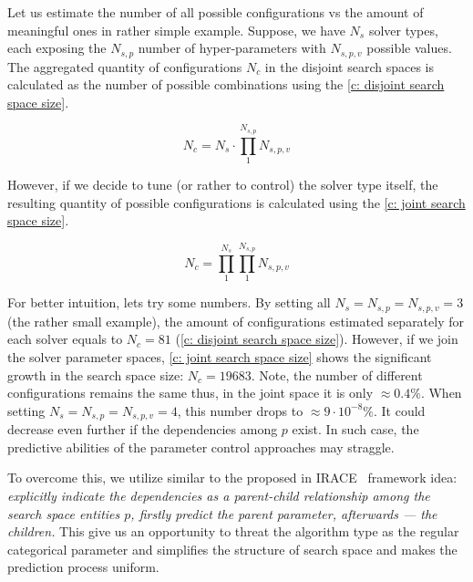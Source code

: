 Let us estimate the number of all possible configurations vs the amount of meaningful ones in rather simple example.
Suppose, we have $N_s$ solver types, each exposing the $N_{s,p}$ number of hyper-parameters with $N_{s,p,v}$ possible values. The aggregated quantity of configurations $N_c$ in the disjoint search spaces is calculated as the number of possible combinations using the \cref{c: disjoint search space size}.

\begin{equation}
N_c = N_s \cdot \prod_{1}^{N_{s,p}} N_{s,p,v}
\label{c: disjoint search space size}
\end{equation}

However, if we decide to tune (or rather to control) the solver type itself, the resulting quantity of possible configurations is calculated using the \cref{c: joint search space size}.

\begin{equation}
N_c = \prod_{1}^{N_{s}} \prod_{1}^{N_{s,p}} N_{s,p,v}
\label{c: joint search space size}
\end{equation}

For better intuition, lets try some numbers. By setting all $N_s = N_{s,p} = N_{s,p,v} = 3$ (the rather small example), the amount of configurations estimated separately for each solver equals to $N_c = 81$ (\cref{c: disjoint search space size}). However, if we join the solver parameter spaces, \cref{c: joint search space size} shows the significant growth in the search space size: $N_c = 19683$. Note, the number of different configurations remains the same thus, in the joint space it is only $\approx 0.4\%$. When setting $N_s = N_{s,p} = N_{s,p,v} = 4$, this number drops to $\approx 9 \cdot 10^{-8}\%$. It could decrease even further if the dependencies among $p$ exist. In such case, the predictive abilities of the parameter control approaches may straggle.

To overcome this, we utilize similar to the proposed in IRACE~\cite{lopez2016irace} framework idea: \emph{explicitly indicate the dependencies as a parent-child relationship among the search space entities $p$, firstly predict the parent parameter, afterwards — the children.} This give us an opportunity to threat the algorithm type as the regular categorical parameter and simplifies the structure of search space and makes the prediction process uniform.


